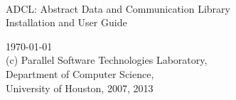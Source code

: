 \documentclass[11pt]{article}
\begin{document}
\begin{titlepage}
 \begin{center}
  \vfill
  {~}
  \vfill
  \vfill
  \vfill
  \vfill
  \vfill

    {\Large
      ADCL: Abstract Data and Communication Library \\
      Installation and User Guide \par}
  \vfill
  \today\\
  \vfill
     {\large (c) Parallel Software Technologies Laboratory, \\
       Department of Computer Science, \\
       University of Houston, 2007, 2013}\\
  \vfill
  \vfill
  \vfill
  \vfill
\end{center}                                                     
\end{titlepage}


\tableofcontents
\cleardoublepage


\pagewiselinenumbers




%


\end{document}
